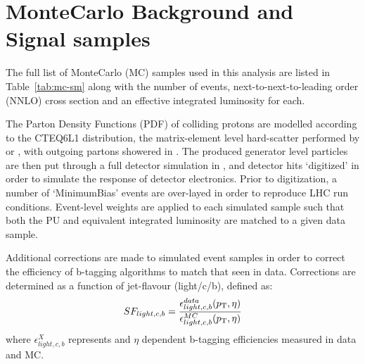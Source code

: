 \section{MonteCarlo Background and Signal samples}

The full list of MonteCarlo (MC) samples used in this analysis are listed in 
Table~\ref{tab:mc-sm} along with the number of events, next-to-next-to-leading 
order (NNLO) cross section and an effective integrated luminosity for each.

The Parton Density Functions (PDF) of colliding protons are modelled according
to the
CTEQ6L1 distribution, the matrix-element level hard-scatter performed by
\MADGRAPHFIVE or \PYTHIASIX, with outgoing partons showered in \PYTHIASIX. The
produced generator level particles are then put through a full detector
simulation in \GEANT, and detector hits `digitized' in order to simulate the
response of detector electronics. Prior to digitization, a number of
`MinimumBias' events are
over-layed in order to reproduce LHC run conditions. Event-level weights
are applied to each simulated sample such that both the PU and equivalent
integrated luminosity are matched to a given data sample.

Additional corrections are made to simulated event samples in order to correct
the efficiency of b-tagging algorithms to match that seen in data. Corrections
are determined as a function of jet-flavour (light/c/b), defined as:
% 
\begin{equation}
SF_{light,c,b} = \frac{\epsilon^{data}_{light,c,b}({p_{\text T}}, \eta)}{\epsilon^
{MC}_ {light,c,b}({p_{\text T}}, \eta)}
\end{equation}
% 
where $\epsilon^{X}_{light, c, b}$ represents \Pt and $\eta$ dependent
b-tagging efficiencies measured in data and MC.

